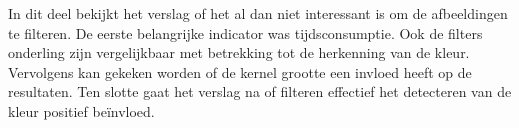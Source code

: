 In dit deel bekijkt het verslag of het al dan niet interessant is om de afbeeldingen te filteren. De eerste belangrijke indicator was tijdsconsumptie. Ook de filters onderling zijn vergelijkbaar met betrekking tot de herkenning van de kleur. Vervolgens kan gekeken worden of de kernel grootte een invloed heeft op de resultaten. Ten slotte gaat het verslag na of filteren effectief het detecteren van de kleur positief beïnvloed. 